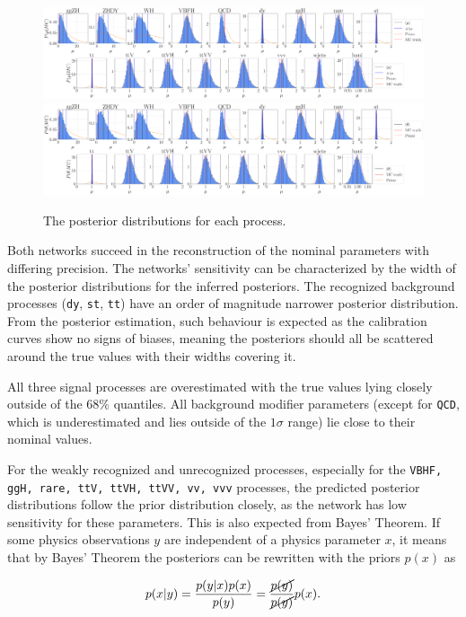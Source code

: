 \begin{figure}[h!]
	\centering
	\includegraphics[width=\linewidth]{figures/inference/finalNoSummarye11000_posteriors}
	\includegraphics[width=\linewidth]{figures/inference/finalSummary1Layer11000e300NodesCdim100_posteriors}
	\caption{The posterior distributions for each process.}
	\label{fig:posteriors}
\end{figure}

Both networks succeed in the reconstruction of the nominal parameters with differing precision. The networks' sensitivity can be characterized by the width of the posterior distributions for the inferred posteriors. The recognized background processes (\texttt{dy}, \texttt{st}, \texttt{tt}) have an order of magnitude narrower posterior distribution. From the posterior estimation, such behaviour is expected as the calibration curves show no signs of biases, meaning the posteriors should all be scattered around the true values with their widths covering it.

All three signal processes are overestimated with the true values lying closely outside of the 68\% quantiles. All background modifier parameters (except for \texttt{QCD}, which is underestimated and lies outside of the $1\sigma$ range) lie close to their nominal values.

For the weakly recognized and unrecognized processes, especially for the \texttt{VBHF, ggH, rare, ttV, ttVH, ttVV, vv, vvv} processes, the predicted posterior distributions follow the prior distribution closely, as the network has low sensitivity for these parameters. This is also expected from Bayes' Theorem. If some physics observations $y$ are independent of a physics parameter $x$, it means that by Bayes' Theorem the posteriors can be rewritten with the priors $p(x)$ as

\begin{equation*}
	p(x|y) = \frac{p(y|x)p(x)}{p(y)} = \frac{\cancel{p(y)}}{\cancel{p(y)}} p(x).
\end{equation*}

